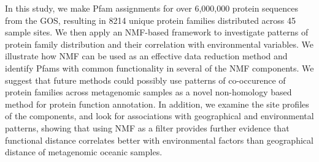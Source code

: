 In this study, we make Pfam assignments for over 6,000,000 protein sequences from the GOS, resulting in 8214 unique protein families distributed across 45 sample sites. We then apply an NMF-based framework to investigate patterns of protein family distribution and their correlation with environmental variables. We illustrate how NMF can be used as an effective data reduction method and identify Pfams with common functionality in several of the NMF components. We suggest that future methods could possibly use patterns of co-occurence of protein families across metagenomic  samples as a novel non-homology based method for protein function annotation. In addition, we examine the site profiles of the components, and look for associations with geographical and environmental patterns, showing that using NMF as a filter provides further evidence that functional distance correlates better with environmental factors than geographical distance of metagenomic oceanic samples.